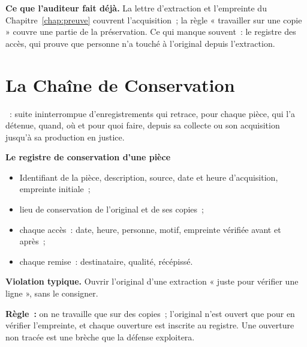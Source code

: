 \begin{boxinfo}
\textbf{Ce que l'auditeur fait déjà.} La lettre d'extraction et
l'empreinte du Chapitre~\ref{chap:preuve} couvrent l'acquisition~; la règle
« travailler sur une copie » couvre une partie de la préservation. Ce qui
manque souvent~: le registre des accès, qui prouve que personne n'a touché
à l'original depuis l'extraction.
\end{boxinfo}

\section{La Chaîne de Conservation}
\label{sec:c29-chaine}

\begin{boxdef}
~: suite
ininterrompue d'enregistrements qui retrace, pour chaque pièce, qui l'a
détenue, quand, où et pour quoi faire, depuis sa collecte ou son
acquisition jusqu'à sa production en justice.
\end{boxdef}

\begin{boxprocedure}
\textbf{Le registre de conservation d'une pièce}
\begin{itemize}
    \item Identifiant de la pièce, description, source, date et heure
          d'acquisition, empreinte initiale~;
    \item lieu de conservation de l'original et de ses copies~;
    \item chaque accès~: date, heure, personne, motif, empreinte vérifiée
          avant et après~;
    \item chaque remise~: destinataire, qualité, récépissé.
\end{itemize}
\end{boxprocedure}

\begin{boxalert}
\textbf{Violation typique.} Ouvrir l'original d'une extraction « juste pour
vérifier une ligne », sans le consigner.

\smallskip
\textbf{Règle~:} on ne travaille que sur des copies~; l'original n'est
ouvert que pour en vérifier l'empreinte, et chaque ouverture est inscrite au
registre. Une ouverture non tracée est une brèche que la défense
exploitera.
\end{boxalert}


